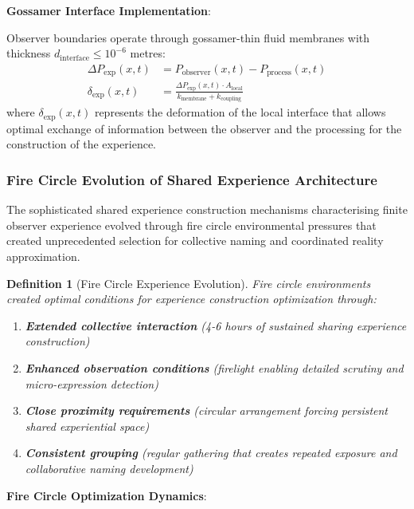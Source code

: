 \documentclass{article}
\newtheorem{definition}[theorem]{Definition}
\begin{document}
\textbf{Gossamer Interface Implementation}:

Observer boundaries operate through gossamer-thin fluid membranes with thickness $d_{\text{interface}} \leq 10^{-6}$ metres:
\begin{align}
\Delta P_{\text{exp}}(x,t) &= P_{\text{observer}}(x,t) - P_{\text{process}}(x,t) \\
\delta_{\text{exp}}(x,t) &= \frac{\Delta P_{\text{exp}}(x,t) \cdot A_{\text{local}}}{k_{\text{membrane}} + k_{\text{coupling}}}
\end{align}
where $\delta_{\text{exp}}(x,t)$ represents the deformation of the local interface that allows optimal exchange of information between the observer and the processing for the construction of the experience.

\subsubsection{Fire Circle Evolution of Shared Experience Architecture}

The sophisticated shared experience construction mechanisms characterising finite observer experience evolved through fire circle environmental pressures that created unprecedented selection for collective naming and coordinated reality approximation.

\begin{definition}[Fire Circle Experience Evolution]
Fire circle environments created optimal conditions for experience construction optimization through:
\begin{enumerate}
\item \textbf{Extended collective interaction} (4-6 hours of sustained sharing experience construction)
\item \textbf{Enhanced observation conditions} (firelight enabling detailed scrutiny and micro-expression detection)
\item \textbf{Close proximity requirements} (circular arrangement forcing persistent shared experiential space)
\item \textbf{Consistent grouping} (regular gathering that creates repeated exposure and collaborative naming development)
\end{enumerate}
\end{definition}

\textbf{Fire Circle Optimization Dynamics}:
\end{document}

